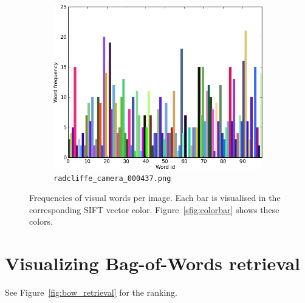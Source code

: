\documentclass[a4paper,10pt]{article}
\begin{document}
\begin{figure}
  \begin{subfigure}{0.49\textwidth}
    \centering
    \includegraphics[width=\textwidth,height=.3\textheight,keepaspectratio]{histogram5}
    \caption{\texttt{radcliffe\_camera\_000437.png}}
  \end{subfigure}
  \caption{Frequencies of visual words per image.  Each bar is visualised in the corresponding SIFT vector color.  Figure~\ref{sfig:colorbar} shows these colors.}
  \label{fig:histograms}
\end{figure}

\section{Visualizing Bag-of-Words retrieval}
See Figure~\ref{fig:bow_retrieval} for the ranking.
\end{document}
